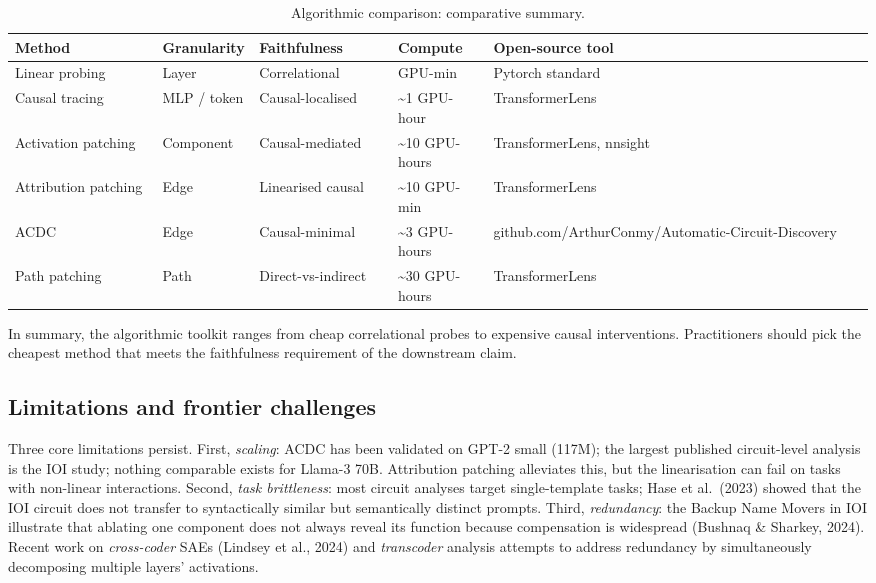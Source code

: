 \documentclass{article}
\begin{document}
\begin{table}[t]
\centering
\caption{Algorithmic comparison: comparative summary.}
\label{tab:algorithmic-comparison}
\begin{tabular}{>{\raggedright\arraybackslash}p{0.1786\linewidth}
  >{\raggedright\arraybackslash}p{0.0982\linewidth}
  >{\raggedright\arraybackslash}p{0.1607\linewidth}
  >{\raggedright\arraybackslash}p{0.1161\linewidth}
  >{\raggedright\arraybackslash}p{0.4464\linewidth}}
\toprule
Method & Granularity & Faithfulness & Compute & Open-source tool \\
\midrule
Linear probing & Layer & Correlational & 1 GPU-min & Pytorch standard \\
Causal tracing & MLP / token & Causal-localised & \textasciitilde1 GPU-hour & TransformerLens \\
Activation patching & Component & Causal-mediated & \textasciitilde10 GPU-hours & TransformerLens, nnsight \\
Attribution patching & Edge & Linearised causal & \textasciitilde10 GPU-min & TransformerLens \\
ACDC & Edge & Causal-minimal & \textasciitilde3 GPU-hours & github.com/ArthurConmy/Automatic-Circuit-Discovery \\
Path patching & Path & Direct-vs-indirect & \textasciitilde30 GPU-hours & TransformerLens \\
\end{tabular}
\end{table}

In summary, the algorithmic toolkit ranges from cheap correlational probes to expensive causal interventions. Practitioners should pick the cheapest method that meets the faithfulness requirement of the downstream claim.

\subsection{Limitations and frontier challenges}\label{limitations-and-frontier-challenges}

Three core limitations persist. First, \emph{scaling}: ACDC has been validated on GPT-2 small (117M); the largest published circuit-level analysis is the IOI study; nothing comparable exists for Llama-3 70B. Attribution patching alleviates this, but the linearisation can fail on tasks with non-linear interactions. Second, \emph{task brittleness}: most circuit analyses target single-template tasks; Hase et al.~(2023) showed that the IOI circuit does not transfer to syntactically similar but semantically distinct prompts. Third, \emph{redundancy}: the Backup Name Movers in IOI illustrate that ablating one component does not always reveal its function because compensation is widespread (Bushnaq \& Sharkey, 2024). Recent work on \emph{cross-coder} SAEs (Lindsey et al., 2024) and \emph{transcoder} analysis \citep{dunefsky2025oneshotoptimizedst} attempts to address redundancy by simultaneously decomposing multiple layers' activations.
\end{document}
